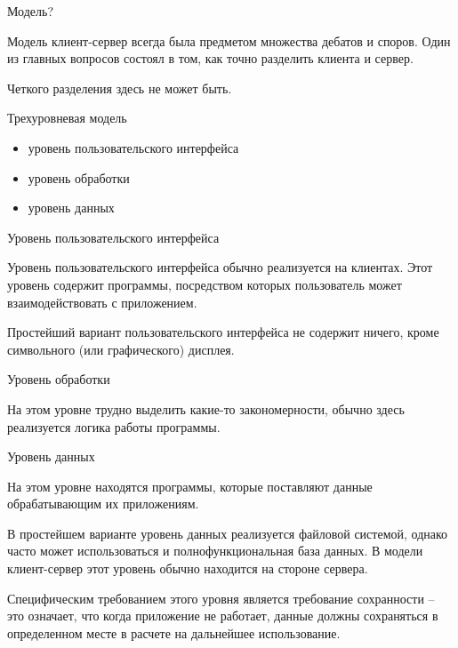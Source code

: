\begin{frame}{Модель?}

	Модель клиент-сервер всегда была предметом множества дебатов и споров. Один из главных вопросов состоял в том,  как точно разделить клиента и сервер.
	
	Четкого разделения здесь не может быть.
\end{frame}

\begin{frame}{Трехуровневая модель}

	\begin{itemize}
		\item уровень пользовательского интерфейса
		\item уровень обработки
		\item уровень данных
	\end{itemize}
\end{frame}

\begin{frame}{Уровень пользовательского интерфейса}

Уровень пользовательского интерфейса обычно реализуется на клиентах. Этот уровень содержит программы,  посредством которых пользователь может взаимодействовать с приложением. 

Простейший вариант пользовательского интерфейса не содержит ничего,  кроме символьного (или графического) дисплея.
\end{frame}

\begin{frame}{Уровень обработки}

	На этом уровне трудно выделить какие-то закономерности,  обычно здесь реализуется логика работы программы. 
\end{frame}

\begin{frame}{Уровень данных}
	
	На этом уровне находятся программы,  которые поставляют данные обрабатывающим их приложениям. 

	В простейшем варианте уровень данных реализуется файловой системой,  однако часто может использоваться и полнофункциональная база данных.  В модели клиент-сервер этот уровень обычно находится на стороне сервера.

	\pause
	Специфическим требованием этого уровня является требование сохранности – это означает,  что когда приложение не работает,  данные должны сохраняться в определенном месте в расчете на дальнейшее использование. \\
\end{frame}

